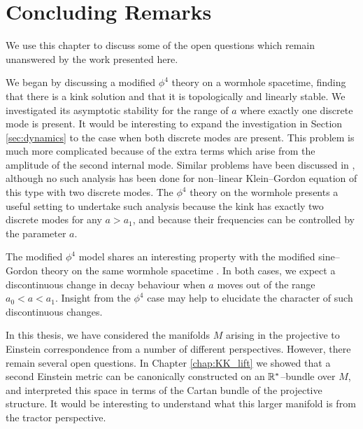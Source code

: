 \chapter{Concluding Remarks}

We use this chapter to discuss some of the open questions which remain unanswered by the work presented here.

We began by discussing a modified $\phi^4$ theory on a wormhole spacetime, finding that there is a kink solution and that it is topologically and linearly stable. We investigated its asymptotic stability for the range of $a$ where exactly one discrete mode is present. It would be interesting to expand the investigation in Section \ref{sec:dynamics} to the case when both discrete modes are present. This problem is much more complicated because of the extra terms which arise from the amplitude of the second internal mode. Similar problems have been discussed in \cite{Weinstein}, although no such analysis has been done for non--linear Klein--Gordon equation of this type with two discrete modes. The $\phi^4$ theory on the wormhole presents a useful setting to undertake such analysis because the kink has exactly two discrete modes for any $a>a_1$, and because their frequencies can be controlled by the parameter $a$.

The modified $\phi^4$ model shares an interesting property with the modified sine--Gordon theory on the same wormhole spacetime \cite{SG}. In both cases, we expect a discontinuous change in decay behaviour when $a$ moves out of the range $a_0<a<a_1$. Insight from the $\phi^4$ case may help to elucidate the character of such discontinuous changes.

In this thesis, we have considered the manifolds $M$ arising in the projective to Einstein correspondence from a number of different perspectives. However, there remain several open questions. In Chapter \ref{chap:KK_lift} we showed that a second Einstein metric can be canonically constructed on an $\mathbb{R}^*$--bundle over $M$, and interpreted this space in terms of the Cartan bundle of the projective structure. It would be interesting to understand what this larger manifold is from the tractor perspective.

